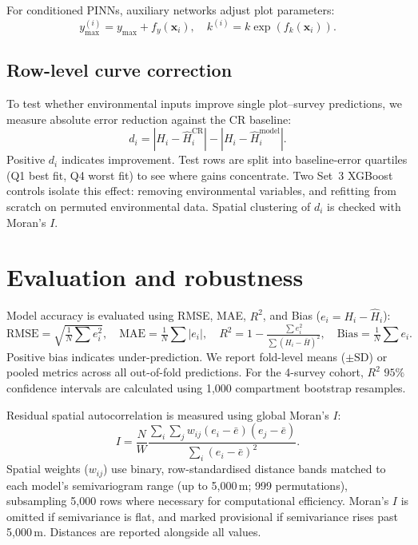 For conditioned PINNs, auxiliary networks adjust plot parameters:
\begin{equation}
y_{\max}^{(i)} = y_{\max}+f_y(\mathbf{x}_i), \quad k^{(i)} = k\exp\!\left(f_k(\mathbf{x}_i)\right).
\label{eq:param-adjust}
\end{equation}

\subsection*{Row-level curve correction}
\label{sec:rq2a-method}
To test whether environmental inputs improve single plot--survey predictions, we measure absolute error reduction against the CR baseline:
\begin{equation}
d_i = \left|H_i-\hat H_i^{\mathrm{CR}}\right| - \left|H_i-\hat H_i^{\mathrm{model}}\right|.
\label{eq:residual-reduction}
\end{equation}
Positive $d_i$ indicates improvement. Test rows are split into baseline-error quartiles (Q1 best fit, Q4 worst fit) to see where gains concentrate. Two Set~3 XGBoost controls isolate this effect: removing environmental variables, and refitting from scratch on permuted environmental data. Spatial clustering of $d_i$ is checked with Moran's $I$.


\section{Evaluation and robustness} \label{sec:eval-robustness}
Model accuracy is evaluated using RMSE, MAE, $R^2$, and Bias ($e_i = H_i - \hat H_i$):
\begin{equation}
\mathrm{RMSE}=\sqrt{\tfrac{1}{N}\textstyle\sum e_i^2}, \quad
\mathrm{MAE}=\tfrac{1}{N}\textstyle\sum |e_i|, \quad
R^2=1-\tfrac{\sum e_i^2}{\sum (H_i-\bar H)^2}, \quad
\mathrm{Bias}=\tfrac{1}{N}\textstyle\sum e_i.
\label{eq:eval-summary}
\end{equation}
Positive bias indicates under-prediction. We report fold-level means ($\pm\text{SD}$) or pooled metrics across all out-of-fold predictions. For the 4-survey cohort, $R^2$ $95\%$ confidence intervals are calculated using 1,000 compartment bootstrap resamples.

Residual spatial autocorrelation is measured using global Moran's $I$:
\begin{equation}
I=\frac{N}{W}\frac{\sum_i\sum_j w_{ij}(e_i-\bar e)(e_j-\bar e)}{\sum_i(e_i-\bar e)^2}.
\label{eq:morans-i}
\end{equation}
Spatial weights ($w_{ij}$) use binary, row-standardised distance bands matched to each model's semivariogram range (up to 5,000\,m; 999 permutations), subsampling 5,000 rows where necessary for computational efficiency. Moran's $I$ is omitted if semivariance is flat, and marked provisional if semivariance rises past 5,000\,m. Distances are reported alongside all values.